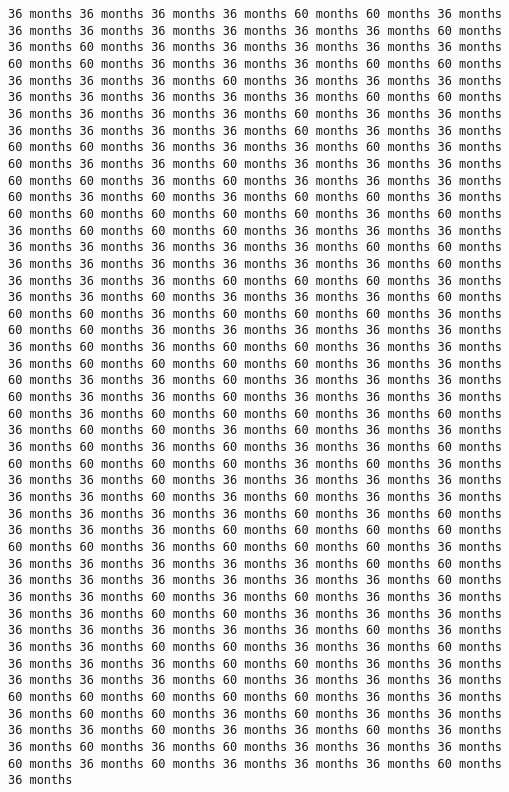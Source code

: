 \documentclass[11pt]{article}
\begin{document}
\begin{Verbatim}[commandchars=\\\{\}, frame=single, framerule=2mm, rulecolor=\color{outerrorbackground}]
36 months 36 months 36 months 36 months 60 months 60 months 36 months 36 months 36 months 36 months 36 months 36 months 36 months 60 months 36 months 60 months 36 months 36 months 36 months 36 months 36 months 60 months 60 months 36 months 36 months 36 months 60 months 60 months 36 months 36 months 36 months 60 months 36 months 36 months 36 months 36 months 36 months 36 months 36 months 36 months 60 months 60 months 36 months 36 months 36 months 36 months 60 months 36 months 36 months 36 months 36 months 36 months 36 months 60 months 36 months 36 months 60 months 60 months 36 months 36 months 36 months 60 months 36 months 60 months 36 months 36 months 60 months 36 months 36 months 36 months 60 months 60 months 36 months 60 months 36 months 36 months 36 months 60 months 36 months 60 months 36 months 60 months 60 months 36 months 60 months 60 months 60 months 60 months 60 months 36 months 60 months 36 months 60 months 60 months 60 months 36 months 36 months 36 months 36 months 36 months 36 months 36 months 36 months 60 months 60 months 36 months 36 months 36 months 36 months 36 months 36 months 60 months 36 months 36 months 36 months 60 months 60 months 60 months 36 months 36 months 36 months 60 months 36 months 36 months 36 months 60 months 60 months 60 months 36 months 60 months 60 months 60 months 36 months 60 months 60 months 36 months 36 months 36 months 36 months 36 months 36 months 60 months 36 months 60 months 60 months 36 months 36 months 36 months 60 months 60 months 60 months 60 months 36 months 36 months 60 months 36 months 36 months 60 months 36 months 36 months 36 months 60 months 36 months 36 months 60 months 36 months 36 months 36 months 60 months 36 months 60 months 60 months 60 months 36 months 60 months 36 months 60 months 60 months 36 months 60 months 36 months 36 months 36 months 60 months 36 months 60 months 36 months 36 months 60 months 60 months 60 months 60 months 60 months 36 months 60 months 36 months 36 months 36 months 60 months 36 months 36 months 36 months 36 months 36 months 36 months 60 months 36 months 60 months 36 months 36 months 36 months 36 months 36 months 36 months 60 months 36 months 60 months 36 months 36 months 36 months 60 months 60 months 60 months 60 months 60 months 60 months 36 months 60 months 60 months 60 months 36 months 36 months 36 months 36 months 36 months 36 months 60 months 60 months 36 months 36 months 36 months 36 months 36 months 36 months 60 months 36 months 36 months 60 months 36 months 60 months 36 months 36 months 36 months 36 months 60 months 60 months 36 months 36 months 36 months 36 months 36 months 36 months 36 months 36 months 60 months 36 months 36 months 36 months 60 months 60 months 36 months 36 months 60 months 36 months 36 months 36 months 60 months 60 months 36 months 36 months 36 months 36 months 36 months 60 months 36 months 36 months 36 months 60 months 60 months 60 months 60 months 60 months 36 months 36 months 36 months 60 months 60 months 36 months 60 months 36 months 36 months 36 months 36 months 60 months 36 months 36 months 60 months 36 months 36 months 60 months 36 months 60 months 36 months 36 months 36 months 60 months 36 months 60 months 36 months 36 months 36 months 60 months 36 months 
\end{Verbatim}
\end{document}
